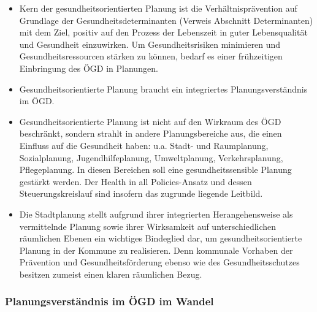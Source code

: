 \documentclass{article}
\begin{document}
\begin{itemize}
\item Kern der gesundheitsorientierten Planung ist die Verhältnisprävention auf Grundlage der Gesundheitsdeterminanten (Verweis Abschnitt Determinanten) mit dem Ziel, positiv auf den Prozess der Lebenszeit in guter Lebensqualität und Gesundheit einzuwirken. Um Gesundheitsrisiken minimieren und Gesundheitsressourcen stärken zu können, bedarf es einer frühzeitigen Einbringung des ÖGD in Planungen.


\item Gesundheitsorientierte Planung braucht ein integriertes Planungsverständnis  im ÖGD.


\item Gesundheitsorientierte Planung ist nicht auf den Wirkraum des ÖGD beschränkt, sondern strahlt in andere Planungsbereiche aus, die einen Einfluss auf die Gesundheit haben: u.a. Stadt- und Raumplanung, Sozialplanung, Jugendhilfeplanung, Umweltplanung, Verkehrsplanung, Pflegeplanung. In diesen Bereichen soll eine gesundheitssensible Planung gestärkt werden. Der Health in all Policies-Ansatz und dessen Steuerungskreislauf sind insofern das zugrunde liegende Leitbild.


\item Die Stadtplanung stellt aufgrund ihrer integrierten Herangehensweise als vermittelnde Planung sowie ihrer Wirksamkeit auf unterschiedlichen räumlichen Ebenen ein wichtiges Bindeglied dar, um gesundheitsorientierte Planung in der Kommune zu realisieren. Denn kommunale Vorhaben der Prävention und Gesundheitsförderung ebenso wie des Gesundheitsschutzes besitzen zumeist einen klaren räumlichen Bezug.


\end{itemize}

\subsubsection{Planungsverständnis im ÖGD im Wandel}\label{H4370740}
\end{document}
